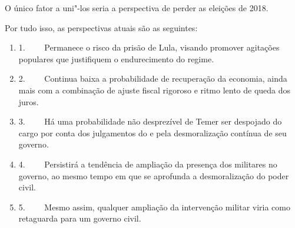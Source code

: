 O único fator a uni"-los seria a perspectiva de perder as eleições de
2018.

Por tudo isso, as perspectivas atuais são as seguintes:

\begin{enumerate}
\itemsep1pt\parskip0pt
\item
  1.~~~~ Permanece o risco da prisão de Lula, visando promover agitações
  populares que justifiquem o endurecimento do regime.
\item
  2.~~~~ Continua baixa a probabilidade de recuperação da economia,
  ainda mais com a combinação de ajuste fiscal rigoroso e ritmo lento de
  queda dos juros.
\item
  3.~~~~ Há uma probabilidade não desprezível de Temer ser despojado do
  cargo por conta dos julgamentos do  e pela desmoralização contínua
  de seu governo.
\item
  4.~~~~ Persistirá a tendência de ampliação da presença dos militares
  no governo, ao mesmo tempo em que se aprofunda a desmoralização do
  poder civil.
\item
  5.~~~~ Mesmo assim, qualquer ampliação da intervenção militar viria
  como retaguarda para um governo civil.
\end{enumerate}
